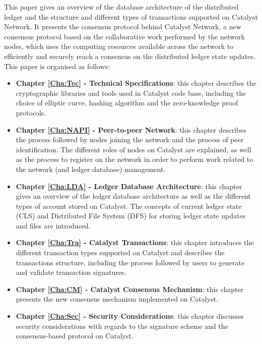 This paper gives an overview of the database architecture of the distributed ledger and the structure and different types of transactions supported on Catalyst Network. It presents the consensus protocol behind Catalyst Network, a new consensus protocol based on the collaborative work performed by the network nodes, which uses the computing resources available across the network to efficiently and securely reach a consensus on the distributed ledger state updates. This paper is organised as follows:

\begin{itemize}
\item \textbf{Chapter \ref{Cha:Tec} - Technical Specifications}: this chapter describes the cryptographic libraries and tools used in Catalyst code base, including the choice of elliptic curve, hashing algorithm and the zero-knowledge proof protocols. 

\item \textbf{Chapter \ref{Cha:NAPI} - Peer-to-peer Network}: this chapter describes the process followed by nodes joining the network and the process of peer identification. The different roles of nodes on Catalyst are explained, as well as the process to register on the network in order to perform work related to the network (and ledger database) management. 

\item \textbf{Chapter \ref{Cha:LDA} - Ledger Database Architecture}: this chapter gives an overview of the ledger database architecture as well as the different types of account stored on Catalyst. The concepts of current ledger state (CLS) and Distributed File System (DFS) for storing ledger state updates and files are introduced. 

\item \textbf{Chapter \ref{Cha:Tra} - Catalyst Transactions}: this chapter introduces the different transaction types supported on Catalyst and describes the transactions structure, including the process followed by users to generate and validate transaction signatures. 

\item \textbf{Chapter \ref{Cha:CM} - Catalyst Consensus Mechanism}: this chapter presents the new consensus mechanism implemented on Catalyst. 



\item \textbf{Chapter \ref{Cha:Sec} - Security Considerations}: this chapter discusses security considerations with regards to the signature scheme and the consensus-based protocol on Catalyst. 

\end{itemize}